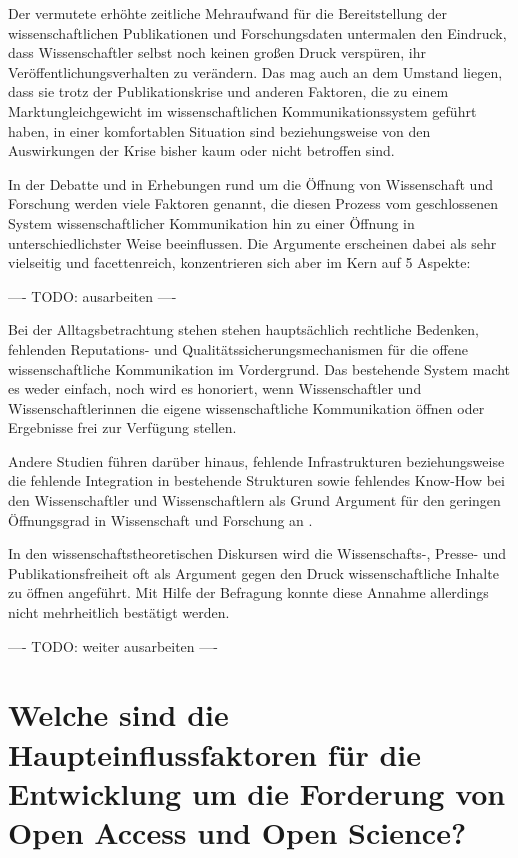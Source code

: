 Der vermutete erhöhte zeitliche Mehraufwand für die Bereitstellung der wissenschaftlichen Publikationen und Forschungsdaten untermalen den Eindruck, dass Wissenschaftler selbst noch keinen großen Druck verspüren, ihr Veröffentlichungsverhalten zu verändern. Das mag auch an dem Umstand liegen, dass sie trotz der Publikationskrise und anderen Faktoren, die zu einem Marktungleichgewicht im wissenschaftlichen Kommunikationssystem geführt haben, in einer komfortablen Situation sind beziehungsweise von den Auswirkungen der Krise bisher kaum oder nicht betroffen sind.

In der Debatte und in Erhebungen rund um die Öffnung von Wissenschaft und Forschung werden viele Faktoren genannt, die diesen Prozess vom geschlossenen System wissenschaftlicher Kommunikation hin zu einer Öffnung in unterschiedlichster Weise beeinflussen. Die Argumente erscheinen dabei als sehr vielseitig und facettenreich, konzentrieren sich aber im Kern auf 5 Aspekte:

---- TODO: ausarbeiten ----

Bei der Alltagsbetrachtung stehen stehen hauptsächlich rechtliche Bedenken, fehlenden Reputations- und Qualitätssicherungsmechanismen für die offene wissenschaftliche Kommunikation im Vordergrund. Das bestehende System macht es weder einfach, noch wird es honoriert, wenn Wissenschaftler und Wissenschaftlerinnen die eigene wissenschaftliche Kommunikation öffnen oder Ergebnisse frei zur Verfügung stellen.

Andere Studien führen darüber hinaus, fehlende Infrastrukturen beziehungsweise die fehlende Integration in bestehende Strukturen sowie fehlendes Know-How bei den Wissenschaftler und Wissenschaftlern als Grund Argument für den geringen Öffnungsgrad in Wissenschaft und Forschung an \cite{eu_open_science_2015}.

In den wissenschaftstheoretischen Diskursen wird die Wissenschafts-, Presse- und Publikationsfreiheit oft als Argument gegen den Druck wissenschaftliche Inhalte zu öffnen angeführt. Mit Hilfe der Befragung konnte diese Annahme allerdings nicht mehrheitlich bestätigt werden.

---- TODO: weiter ausarbeiten ----

\section{Welche sind die Haupteinflussfaktoren für die Entwicklung um die Forderung von Open Access und Open Science?}

